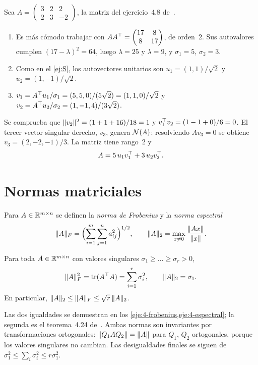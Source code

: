 \begin{ejemplo}\label{ej:svd23}
Sea $A=\begin{pmatrix}3&2&2\\2&3&-2\end{pmatrix}$, la matriz del ejercicio~4.8 de~\cite{mml}.
\begin{enumerate}[label=\arabic*.]
  \item Es más cómodo trabajar con $AA^{\top}=\begin{pmatrix}17&8\\8&17\end{pmatrix}$, de orden~2. Sus autovalores cumplen $(17-\lambda)^{2}=64$, luego $\lambda=25$ y $\lambda=9$, y $\sigma_1=5$, $\sigma_2=3$.
  \item Como en el \cref{ej:S}, los autovectores unitarios son $u_1=(1,1)/\sqrt{2}$ y $u_2=(1,-1)/\sqrt{2}$.
  \item $v_1=A^{\top} u_1/\sigma_1=(5,5,0)/(5\sqrt{2})=(1,1,0)/\sqrt{2}$ y $v_2=A^{\top} u_2/\sigma_2=(1,-1,4)/(3\sqrt{2})$.
\end{enumerate}
Se comprueba que $\lVert v_2\rVert^{2}=(1+1+16)/18=1$ y $v_1^{\top} v_2=(1-1+0)/6=0$. El tercer vector singular derecho, $v_3$, genera $\mathcal{N}(A)$: resolviendo $Av_3=0$ se obtiene $v_3=(2,-2,-1)/3$. La matriz tiene rango~2 y
\[
A=5\,u_1v_1^{\top}+3\,u_2v_2^{\top}.
\]
\end{ejemplo}

\section{Normas matriciales}

\begin{definicion}
Para $A\in\mathbb{R}^{m\times n}$ se definen la \emph{norma de Frobenius} y la \emph{norma espectral}
\[
\lVert A\rVert_F=\Bigl(\sum_{i=1}^{m}\sum_{j=1}^{n}a_{ij}^{2}\Bigr)^{1/2},\qquad
\lVert A\rVert_2=\max_{x\ne 0}\frac{\lVert Ax\rVert}{\lVert x\rVert}.
\]
\end{definicion}

\begin{proposicion}\label{prop:normas-svd}
Para toda $A\in\mathbb{R}^{m\times n}$ con valores singulares $\sigma_1\ge\dots\ge\sigma_r>0$,
\[
\lVert A\rVert_F^{2}=\operatorname{tr}(A^{\top} A)=\sum_{i=1}^{r}\sigma_i^{2},\qquad \lVert A\rVert_2=\sigma_1.
\]
En particular, $\lVert A\rVert_2\le\lVert A\rVert_F\le\sqrt{r}\,\lVert A\rVert_2$.
\end{proposicion}

Las dos igualdades se demuestran en los \cref{eje:4-frobenius,eje:4-espectral}; la segunda es el teorema~4.24 de~\cite{mml}. Ambas normas son invariantes por transformaciones ortogonales: $\lVert Q_1AQ_2\rVert=\lVert A\rVert$ para $Q_1$, $Q_2$ ortogonales, porque los valores singulares no cambian. Las desigualdades finales se siguen de $\sigma_1^{2}\le\sum_i\sigma_i^{2}\le r\sigma_1^{2}$.

